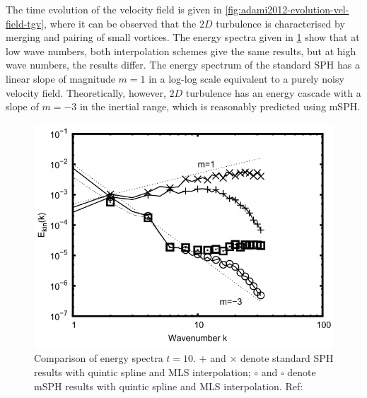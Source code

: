 The time evolution of the velocity field is given in \ref{fig:adami2012-evolution-vel-field-tgv}, where it can be observed that the $2D$ turbulence is characterised by merging and pairing of small vortices. The energy spectra given in \ref{fig:adami2012-energy-spectra-tgv} show that at low wave numbers, both interpolation schemes give the same results, but at high wave numbers, the results differ. The energy spectrum of the standard SPH has a linear slope of magnitude $m = 1$ in a log-log scale equivalent to a purely noisy velocity field. Theoretically, however, $2D$ turbulence has an energy cascade with a slope of $m = -3$ in the inertial range, which is reasonably predicted using mSPH.
\begin{figure}[h!]
	\centering
	\includegraphics[scale=0.55]{Figures/research_papers/adami2012-energy-spectra-tgv.png}
	\caption{Comparison of energy spectra $t=10$. $+$ and $\times$ denote standard SPH results with quintic spline and MLS interpolation; $\circ$ and $\square$ denote mSPH results with quintic spline and MLS interpolation. Ref: \parencite{Adami2012} }
	\label{fig:adami2012-energy-spectra-tgv}
\end{figure}

